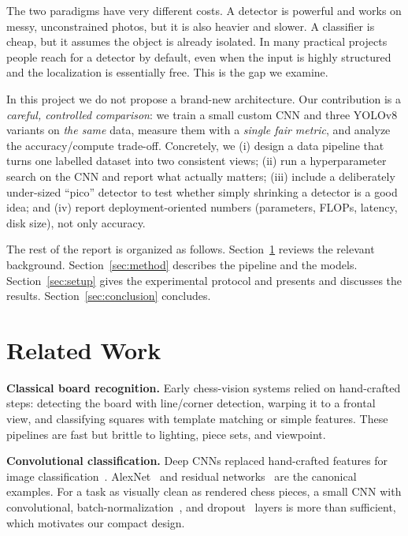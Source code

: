 \documentclass[10pt,twocolumn,a4paper]{article}
\begin{document}
	The two paradigms have very different costs. A detector is powerful and works on messy, unconstrained photos, but it is also heavier and slower. A classifier is cheap, but it assumes the object is already isolated. In many practical projects people reach for a detector by default, even when the input is highly structured and the localization is essentially free. This is the gap we examine.

	In this project we do not propose a brand-new architecture. Our contribution is a \emph{careful, controlled comparison}: we train a small custom CNN and three YOLOv8 variants on \emph{the same} data, measure them with a \emph{single fair metric}, and analyze the accuracy/compute trade-off. Concretely, we (i) design a data pipeline that turns one labelled dataset into two consistent views; (ii) run a hyperparameter search on the CNN and report what actually matters; (iii) include a deliberately under-sized ``pico'' detector to test whether simply shrinking a detector is a good idea; and (iv) report deployment-oriented numbers (parameters, FLOPs, latency, disk size), not only accuracy.

	The rest of the report is organized as follows. Section~\ref{sec:related} reviews the relevant background. Section~\ref{sec:method} describes the pipeline and the models. Section~\ref{sec:setup} gives the experimental protocol and presents and discusses the results. Section~\ref{sec:conclusion} concludes.

	\section{Related Work}
	\label{sec:related}

	\textbf{Classical board recognition.} Early chess-vision systems relied on hand-crafted steps: detecting the board with line/corner detection, warping it to a frontal view, and classifying squares with template matching or simple features. These pipelines are fast but brittle to lighting, piece sets, and viewpoint.

	\textbf{Convolutional classification.} Deep CNNs replaced hand-crafted features for image classification~\cite{lecun2015deep}. AlexNet~\cite{krizhevsky2012alexnet} and residual networks~\cite{he2016resnet} are the canonical examples. For a task as visually clean as rendered chess pieces, a small CNN with convolutional, batch-normalization~\cite{ioffe2015batchnorm}, and dropout~\cite{srivastava2014dropout} layers is more than sufficient, which motivates our compact design.
\end{document}
